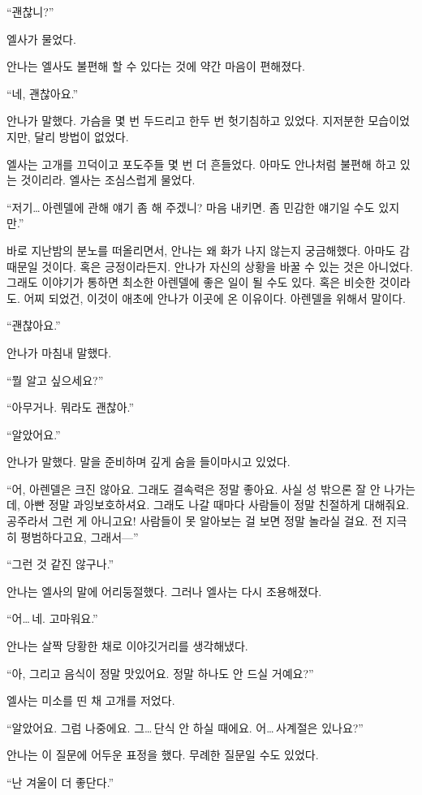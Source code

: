 ``괜찮니?''

엘사가 물었다.

안나는 엘사도 불편해 할 수 있다는 것에 약간 마음이 편해졌다.

``네, 괜찮아요.''

안나가 말했다. 가슴을 몇 번 두드리고 한두 번 헛기침하고 있었다. 지저분한 모습이었지만, 달리 방법이 없었다.

엘사는 고개를 끄덕이고 포도주들 몇 번 더 흔들었다. 아마도 안나처럼 불편해 하고 있는 것이리라. 엘사는 조심스럽게 물었다.

``저기\ldots\,아렌델에 관해 얘기 좀 해 주겠니? 마음 내키면. 좀 민감한 얘기일 수도 있지만.''

바로 지난밤의 분노를 떠올리면서, 안나는 왜 화가 나지 않는지 궁금해했다. 아마도 감 때문일 것이다. 혹은 긍정이라든지. 안나가 자신의 상황을 바꿀 수 있는 것은 아니었다. 그래도 이야기가 통하면 최소한 아렌델에 좋은 일이 될 수도 있다. 혹은 비슷한 것이라도. 어찌 되었건, 이것이 애초에 안나가 이곳에 온 이유이다. 아렌델을 위해서 말이다.

``괜찮아요.''

안나가 마침내 말했다.

``뭘 알고 싶으세요?''

``아무거나. 뭐라도 괜찮아.''

``알았어요.''

안나가 말했다. 말을 준비하며 깊게 숨을 들이마시고 있었다.

``어, 아렌델은 크진 않아요. 그래도 결속력은 정말 좋아요. 사실 성 밖으론 잘 안 나가는데, 아빤 정말 과잉보호하셔요. 그래도 나갈 때마다 사람들이 정말 친절하게 대해줘요. 공주라서 그런 게 아니고요! 사람들이 못 알아보는 걸 보면 정말 놀라실 걸요. 전 지극히 평범하다고요, 그래서—''

``그런 것 같진 않구나.''

안나는 엘사의 말에 어리둥절했다. 그러나 엘사는 다시 조용해졌다.

``어\ldots\,네. 고마워요.''

안나는 살짝 당황한 채로 이야깃거리를 생각해냈다.

``아, 그리고 음식이 정말 맛있어요. 정말 하나도 안 드실 거예요?''

엘사는 미소를 띤 채 고개를 저었다.

``알았어요. 그럼 나중에요. 그\ldots\,단식 안 하실 때에요. 어\ldots\,사계절은 있나요?''

안나는 이 질문에 어두운 표정을 했다. 무례한 질문일 수도 있었다.

``난 겨울이 더 좋단다.''

